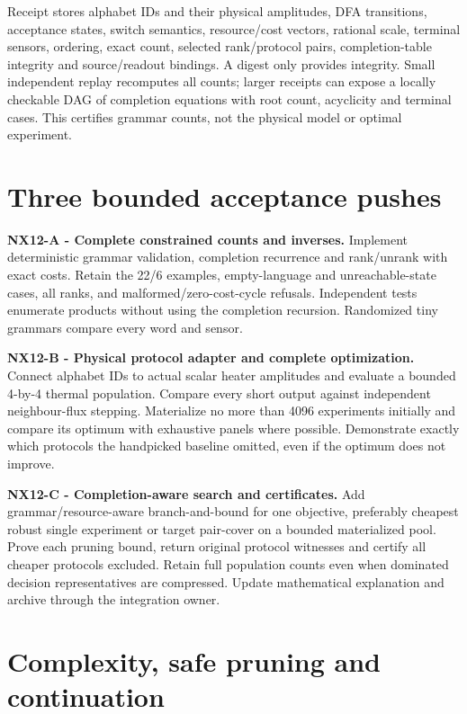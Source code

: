 \documentclass[
  11pt,
  a4paper,
]{report}
\let\nxtexttt\texttt
\renewcommand{\texttt}[1]{\nxtexttt{\seqsplit{#1}}}
\begin{document}
Receipt \texttt{singularity.protocol-population/1} stores alphabet IDs
and their physical amplitudes, DFA transitions, acceptance states,
switch semantics, resource/cost vectors, rational scale, terminal
sensors, ordering, exact count, selected rank/protocol pairs,
completion-table integrity and source/readout bindings. A digest only
provides integrity. Small independent replay recomputes all counts;
larger receipts can expose a locally checkable DAG of completion
equations with root count, acyclicity and terminal cases. This certifies
grammar counts, not the physical model or optimal experiment.

\hypertarget{three-bounded-acceptance-pushes-2}{%
\section{Three bounded acceptance
pushes}\label{three-bounded-acceptance-pushes-2}}

\textbf{NX12-A - Complete constrained counts and inverses.} Implement
deterministic grammar validation, completion recurrence and rank/unrank
with exact costs. Retain the 22/6 examples, empty-language and
unreachable-state cases, all ranks, and malformed/zero-cost-cycle
refusals. Independent tests enumerate products without using the
completion recursion. Randomized tiny grammars compare every word and
sensor.

\textbf{NX12-B - Physical protocol adapter and complete optimization.}
Connect alphabet IDs to actual scalar heater amplitudes and evaluate a
bounded 4-by-4 thermal population. Compare every short output against
independent neighbour-flux stepping. Materialize no more than 4096
experiments initially and compare its optimum with exhaustive panels
where possible. Demonstrate exactly which protocols the handpicked
baseline omitted, even if the optimum does not improve.

\textbf{NX12-C - Completion-aware search and certificates.} Add
grammar/resource-aware branch-and-bound for one objective, preferably
cheapest robust single experiment or target pair-cover on a bounded
materialized pool. Prove each pruning bound, return original protocol
witnesses and certify all cheaper protocols excluded. Retain full
population counts even when dominated decision representatives are
compressed. Update mathematical explanation and archive through the
integration owner.

\hypertarget{complexity-safe-pruning-and-continuation}{%
\section{Complexity, safe pruning and
continuation}\label{complexity-safe-pruning-and-continuation}}
\end{document}
